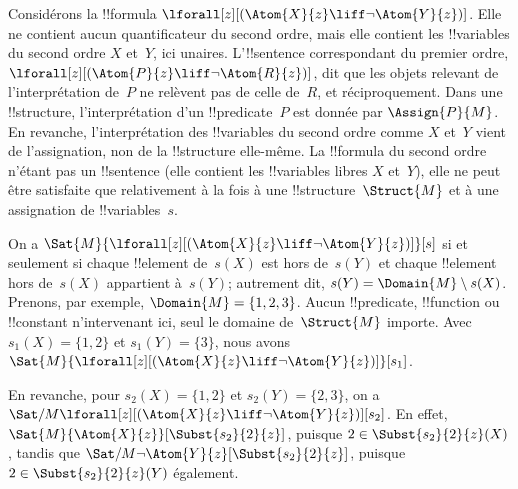 \documentclass[../../../include/open-logic-section]{subfiles}
\begin{document}
\begin{ex}
Considérons la !!{formula}
$\lforall[z][(\Atom{X}{z}\liff
\lnot\Atom{Y}{z})]$. Elle ne contient aucun
quantificateur du second ordre, mais elle contient
les !!{variable}s du second ordre $X$ et~$Y$,
ici unaires. L'!!{sentence} correspondant du
premier ordre,
$\lforall[z][(\Atom{P}{z}\liff
\lnot\Atom{R}{z})]$, dit que les objets relevant
de l'interprétation de~$P$ ne relèvent pas de celle
de~$R$, et réciproquement. Dans une
!!{structure}, l'interprétation d'un
!!{predicate}~$P$ est donnée par
$\Assign{P}{M}$. En revanche, l'interprétation
des !!{variable}s du second ordre comme $X$
et~$Y$ vient de l'assignation, non de la
!!{structure} elle-même. La !!{formula} du
second ordre n'étant pas un !!{sentence}
(elle contient les !!{variable}s libres $X$
et~$Y$), elle ne peut être satisfaite que
relativement à la fois à une
!!{structure}~$\Struct{M}$ et à une
assignation de !!{variable}s~$s$.

On a
$\Sat{M}{\lforall[z][(\Atom{X}{z}\liff
\lnot\Atom{Y}{z})]}[s]$
si et seulement si chaque !!{element} de~$s(X)$
est hors de~$s(Y)$ et chaque !!{element} hors
de~$s(X)$ appartient à~$s(Y)$; autrement dit,
$s(Y)=\Domain{M}\setminus s(X)$.
Prenons, par exemple,
$\Domain{M}=\{1,2,3\}$. Aucun !!{predicate},
!!{function} ou !!{constant}
n'intervenant ici, seul le domaine de~$\Struct{M}$
importe. Avec $s_1(X)=\{1,2\}$ et
$s_1(Y)=\{3\}$, nous avons
$\Sat{M}{\lforall[z][(\Atom{X}{z}\liff
\lnot\Atom{Y}{z})]}[s_1]$.

En revanche, pour $s_2(X)=\{1,2\}$ et
$s_2(Y)=\{2,3\}$, on a
$\Sat/{M}{\lforall[z][(\Atom{X}{z}\liff
\lnot\Atom{Y}{z})]}[s_2]$.
En effet,
$\Sat{M}{\Atom{X}{z}}[\Subst{s_2}{2}{z}]$,
puisque $2\in\Subst{s_2}{2}{z}(X)$, tandis que
$\Sat/{M}{\lnot\Atom{Y}{z}}
[\Subst{s_2}{2}{z}]$,
puisque $2\in\Subst{s_2}{2}{z}(Y)$ également.
\end{ex}
\end{document}
